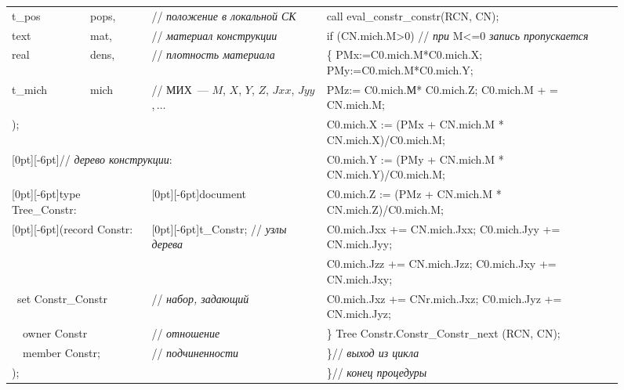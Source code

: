\begin{multicols}{2}
\begin{figure*}
\begin{center}
{\begin{tabular}{llll}
t\_pos &pops, &// \textit{положение в локальной СК }&                     call eval\_constr\_constr(RCN, CN);\\                                    
text &mat, &// \textit{материал конструкции}&                             if (CN.mich.M>0) // \textit{при} M<=0 \textit{запись пропускается}\\     
real &dens, &// \textit{плотность материала}&                             \{ PMx:=C0.mich.M*C0.mich.X; PMy:=C0.mich.M*C0.mich.Y;\\                 
t\_mich &mich &// МИХ~--- $M$, $X$, $Y$, $Z$, $Jxx$, $Jyy$,\,$\ldots$&    PMz:= C0.mich.М* C0.mich.Z; C0.mich.M + = CN.mich.M;\\                   
\multicolumn{3}{l}{);}&                                                   C0.mich.X := (PMx + CN.mich.M * CN.mich.X)/C0.mich.M;\\                  
\multicolumn{3}{l}{{\raisebox{-6pt}[0pt][-6pt]{\hspace*{10mm}// \textit{дерево конструкции}:}}} &C0.mich.Y := (PMy + CN.mich.M * CN.mich.Y)/C0.mich.M;\\
\multicolumn{2}{l}{{\raisebox{-6pt}[0pt][-6pt]{type Tree\_Constr:}}} & {\raisebox{-6pt}[0pt][-6pt]{document}}
                      &C0.mich.Z := (PMz + CN.mich.M * CN.mich.Z)/C0.mich.M;\\
\multicolumn{2}{l}{{\raisebox{-6pt}[0pt][-6pt]{(record Constr:}}}   & {\raisebox{-6pt}[0pt][-6pt]{t\_Constr; // \textit{узлы дерева}}}
         &C0.mich.Jxx += CN.mich.Jxx; C0.mich.Jyy += CN.mich.Jyy;\\
\multicolumn{3}{l}{\ } & C0.mich.Jzz += CN.mich.Jzz; C0.mich.Jxy += CN.mich.Jxy;\\               
\multicolumn{2}{l}{\ set Constr\_Constr} & // \textit{набор, задающий}&   C0.mich.Jxz += CNr.mich.Jxz; C0.mich.Jyz += CN.mich.Jyz;\\              
\multicolumn{2}{l}{\ \ owner Constr} &// \textit{отношение }&             \} Tree Constr.Constr\_Constr\_next (RCN, CN);\\                        
\multicolumn{2}{l}{\ \ member Constr;} & // \textit{подчиненности}&       \}// \textit{выход из цикла}\\                                           
\multicolumn{3}{l}{);} &                                                  \}// \textit{конец процедуры}                                            
\end{tabular}}                                                            
\end{center}


\end{figure*}
\end{multicols}
